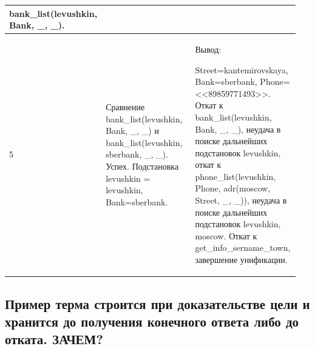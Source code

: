 \documentclass[a4paper,12pt]{article}
\begin{document}
\begin{table} [h!]
\begin{center}
\begin{tabular}{|p{0.05\linewidth}|p{0.5\linewidth}|p{0.4\linewidth}|}
{					bank\_list(levushkin, Bank, \_, \_).}\\
				\hline
				{5} & {Сравнение bank\_list(levushkin, Bank, \_, \_) и bank\_list(levushkin, sberbank, \_, \_). Успех. Подстановка levushkin = levushkin, Bank=sberbank.} & {Вывод:
					
					Street=kantemirovskaya, Bank=sberbank, Phone=<<89859771493>>. Откат к bank\_list(levushkin, Bank, \_, \_), неудача в поиске дальнейших подстановок levushkin, откат к phone\_list(levushkin, Phone, adr(moscow, Street, \_, \_)), неудача в поиске дальнейших подстановок levushkin, moscow. Откат к get\_info\_sername\_town, завершение унификации.}\\
				\hline
			\end{tabular}  
			\label{m6}
		\end{center}
	\end{table}

	\newpage
	
	\subsection*{Пример терма строится при доказательстве цели и хранится до получения
конечного ответа либо до отката.   ЗАЧЕМ?
	}



	
\end{document}
